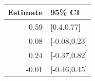 \begin{tabular}{rl}
  \hline
Estimate & 95\% CI \\ 
  \hline
0.59 & [0.4,0.77] \\ 
  0.08 & [-0.08,0.23] \\ 
  0.24 & [-0.37,0.82] \\ 
  -0.01 & [-0.46,0.45] \\ 
   \hline
\end{tabular}


